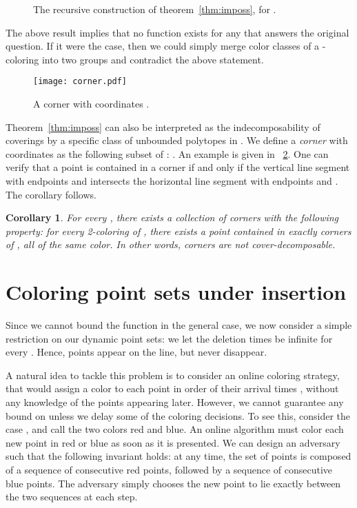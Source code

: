 \documentclass[11pt,a4paper]{amsart}
\theoremstyle{plain}
\newtheorem{cor}[theorem]{Corollary}
\theoremstyle{definition}
\begin{document}
\begin{figure}[h!]
  \vspace{.2cm}
  \centering
\hspace{.2cm}
  \caption{The recursive construction of theorem~\ref{thm:imposs}, for .}
  \label{fig:imposs}
\end{figure}

The above result implies that no function  exists for any  that answers the original question. If it were the case, then we could simply merge
color classes of a -coloring into two groups and contradict the above statement.

\begin{figure}
\begin{center}
\texttt{[image: corner.pdf]}
\end{center}
\caption{\label{fig:corner}A corner with coordinates .}
\end{figure}

Theorem~\ref{thm:imposs} can also be interpreted as the indecomposability of coverings by a specific class of unbounded polytopes in . We define a {\em corner} with coordinates  as the following subset of : . An example is given in \figurename~\ref{fig:corner}. One can verify that a point  is contained in a corner
 if and only if the vertical line segment with endpoints  and  intersects the horizontal line segment with endpoints  and . The corollary follows.
\begin{cor}
\label{cor:indec}
For every , there exists a collection  of corners with the following property: for every 2-coloring of , there exists a point  contained in exactly  corners of , all of the same color. In other words, corners are not cover-decomposable. 
\end{cor}

\section{Coloring point sets under insertion}
\label{sec:main}

Since we cannot bound the function  in the general case, we now consider a simple restriction on our dynamic point sets: we let the deletion times  be infinite for every . Hence, points appear on the line, but never disappear.

A natural idea to tackle this problem is to consider an online coloring strategy, that would assign a color to each point in order of their arrival times , without any knowledge of the points appearing later. However, we cannot guarantee any bound on  unless we delay some of the coloring decisions. To see this, consider the case , and call the two colors red and blue. An online algorithm must color each new point in red or blue as soon as it is presented. We can design an adversary such that the following invariant holds: at any time, the set of points is composed of a sequence of consecutive red points, followed by a sequence of consecutive blue points. The adversary simply chooses the new point to lie exactly between the two sequences at each step.
\end{document}
